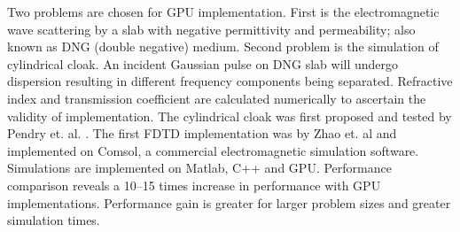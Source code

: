\documentclass{book}    %
\begin{document}
\begin{paper}
Two problems are chosen for GPU implementation. First is the electromagnetic wave scattering by a slab with negative permittivity and permeability; also known as DNG (double negative) medium. Second problem is the simulation of cylindrical cloak. An incident Gaussian pulse on DNG slab will undergo dispersion resulting in different frequency components being separated. Refractive index and transmission coefficient are calculated numerically to ascertain the validity of implementation. The cylindrical cloak was first proposed and tested by Pendry et. al. \cite{PendryShurig-MicrowaveCloak}. The first FDTD implementation was by Zhao et. al \cite{Radial-Zhao} and implemented on Comsol, a commercial electromagnetic simulation software. Simulations are implemented on Matlab, C++ and GPU. Performance comparison reveals a 10--15 times increase in performance with GPU implementations. Performance gain is greater for larger problem sizes and greater simulation times.
\begin{figure}[H]
\mbox{
	}
\end{figure}
\end{paper}
\end{document}
